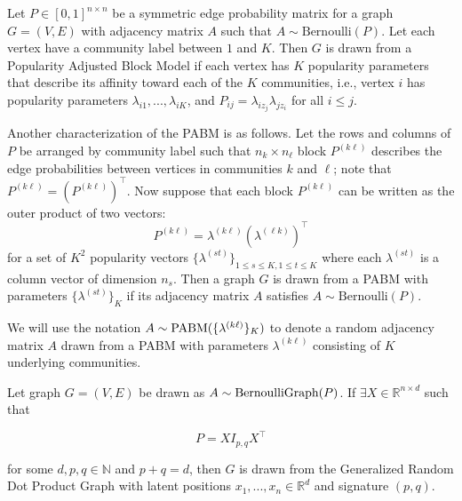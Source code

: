 \documentclass[12pt]{article}
\begin{document}
\begin{definition}
\label{pabm}
Let $P \in [0, 1]^{n \times n}$ be a symmetric edge probability matrix for a
graph $G = (V, E)$ with adjacency matrix $A$ 
such that $A \sim \mathrm{Bernoulli}(P)$.
Let each vertex have a community label between $1$ and $K$.
Then $G$ is drawn from a Popularity Adjusted Block Model if
each vertex has $K$ popularity parameters that describe its affinity
toward each of the $K$ communities, i.e., vertex $i$ has popularity parameters
$\lambda_{i1}, ..., \lambda_{iK}$, and  $P_{ij} = \lambda_{i z_j}
\lambda_{j z_i}$ for all $i \leq j$. 

Another characterization of the PABM is as follows.
Let the rows and columns of $P$ be arranged by community label
such that $n_k \times n_{\ell}$ block $P^{(k \ell)}$
describes the edge probabilities between vertices in communities
$k$ and $\ell$; note that $P^{(k \ell)} = (P^{(k \ell)})^\top$.
Now suppose that each block $P^{(k \ell)}$ can be written as the outer product of two vectors:
\begin{equation} \label{eq:pabm}
  P^{(k \ell)} = \lambda^{(k \ell)} (\lambda^{(\ell k)})^\top
\end{equation}
for a set of $K^2$ popularity vectors $\{\lambda^{(st)}\}_{1 \leq
  s \leq K, 1 \leq t \leq K}$ where each
$\lambda^{(st)}$ is a column vector of dimension $n_s$. Then a graph $G$
is drawn from a PABM with parameters
$\{\lambda^{(st)}\}_K$ if its adjacency matrix $A$
satisfies $A \sim \mathrm{Bernoulli}(P)$.
\end{definition}

We will use the notation \(A \sim \mathrm{PABM}(\{\lambda^{(k \ell)}\}_K)\) to denote
a random adjacency matrix \(A\) drawn from a PABM with parameters
\(\lambda^{(k \ell)}\) consisting of \(K\) underlying communities.

\begin{definition}
\label{grdpg}
Let graph $G = (V, E)$ be drawn as $A \sim \mathrm{BernoulliGraph}(P)$.
If $\exists X \in \mathbb{R}^{n \times d}$ such that

\begin{equation} \label{eq:grdpg}
  P = X I_{p,q} X^\top
\end{equation}

for some $d, p, q \in \mathbb{N}$ and $p + q = d$, then
$G$ is drawn from the Generalized Random Dot Product Graph 
with latent positions $x_1, ..., x_n \in \mathbb{R}^d$ and signature $(p, q)$.
\end{definition}
\end{document}
